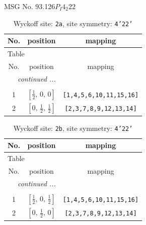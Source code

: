 \documentclass[fleqn,8pt]{jsarticle}
\begin{document}
\setcounter{MaxMatrixCols}{32}

\renewcommand{\tablename}{Table~}
\renewcommand{\figurename}{Figure~}
\begin{center}
\LARGE
MSG No. 93.126\quad$P_{I}4_{2}22$
\end{center}
\renewcommand{\arraystretch}{1.2}
\begin{longtable}{ccc}
\caption{Wyckoff site: {\tt 2a}, site symmetry: {\tt 4'22'}}
 \\
 \hline \hline
No. & position & mapping \\ \hline \endfirsthead

\multicolumn{2}{l}{\tablename\ \thetable{}} \\
 \hline \hline
No. & position & mapping \\ \hline \endhead

 \hline \hline
\multicolumn{2}{r}{\footnotesize\it continued ...} \\ \endfoot

 \hline \hline
\multicolumn{2}{r}{} \\ \endlastfoot

1 & $\left[ \frac{1}{2},\, 0,\, 0 \right]$ & {\tt [1,4,5,6,10,11,15,16]} \\ \hline
2 & $\left[ 0,\, \frac{1}{2},\, \frac{1}{2} \right]$ & {\tt [2,3,7,8,9,12,13,14]} \\
\end{longtable}
\renewcommand{\arraystretch}{1.2}
\begin{longtable}{ccc}
\caption{Wyckoff site: {\tt 2b}, site symmetry: {\tt 4'22'}}
 \\
 \hline \hline
No. & position & mapping \\ \hline \endfirsthead

\multicolumn{2}{l}{\tablename\ \thetable{}} \\
 \hline \hline
No. & position & mapping \\ \hline \endhead

 \hline \hline
\multicolumn{2}{r}{\footnotesize\it continued ...} \\ \endfoot

 \hline \hline
\multicolumn{2}{r}{} \\ \endlastfoot

1 & $\left[ \frac{1}{2},\, 0,\, \frac{1}{2} \right]$ & {\tt [1,4,5,6,10,11,15,16]} \\ \hline
2 & $\left[ 0,\, \frac{1}{2},\, 0 \right]$ & {\tt [2,3,7,8,9,12,13,14]} \\
\end{longtable}
\end{document}
